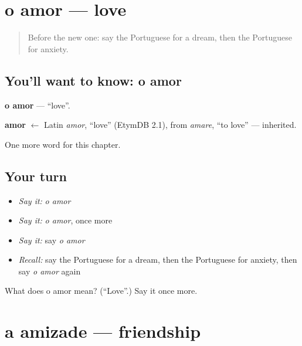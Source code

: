 \section[o amor]{o amor — love}

\label{lesson:PT-C149-amor}



\begin{quote}
Before the new one: say the Portuguese for a dream, then the Portuguese for anxiety.
\end{quote}

\subsection*{You'll want to know: o amor}
\textbf{o amor} — \textquotedblleft{}love\textquotedblright{}.

\begin{cousinweb}
\textbf{amor} $\leftarrow$ Latin \emph{amor}, \textquotedblleft{}love\textquotedblright{} (EtymDB 2.1), from \emph{amare}, \textquotedblleft{}to love\textquotedblright{} — inherited.
\end{cousinweb}

\begin{grammarlens}[title={What you've built}]
One more word for this chapter.
\end{grammarlens}

\subsection*{Your turn}
\begin{itemize}
\raggedright
  \item \emph{Say it:} \emph{o amor}
  \item \emph{Say it:} \emph{o amor}, once more
  \item \emph{Say it:} say \emph{o amor}
  \item \emph{Recall:} say the Portuguese for a dream, then the Portuguese for anxiety, then say \emph{o amor} again
\end{itemize}

\begin{tcolorbox}[breakable,colback=teal!4,colframe=teal!35!black,title={Before you move on}]
What does o amor mean? (\textquotedblleft{}Love\textquotedblright{}.) Say it once more.
\end{tcolorbox}
\section[a amizade]{a amizade — friendship}

